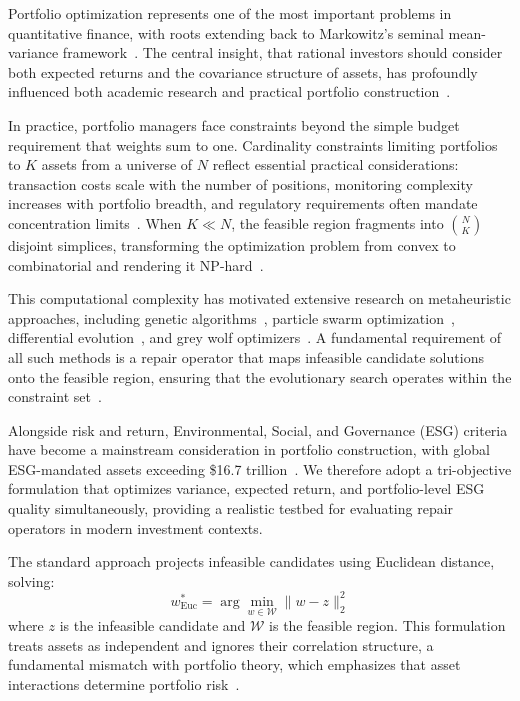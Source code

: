\documentclass[10pt,twocolumn,a4paper]{article}
\begin{document}
Portfolio optimization represents one of the most important problems in quantitative finance, with roots extending back to Markowitz's seminal mean-variance framework~\cite{markowitz1952portfolio}. The central insight, that rational investors should consider both expected returns and the covariance structure of assets, has profoundly influenced both academic research and practical portfolio construction~\cite{zhang2018portfolio, kalayci2019comprehensive}.

In practice, portfolio managers face constraints beyond the simple budget requirement that weights sum to one. Cardinality constraints limiting portfolios to $K$ assets from a universe of $N$ reflect essential practical considerations: transaction costs scale with the number of positions, monitoring complexity increases with portfolio breadth, and regulatory requirements often mandate concentration limits~\cite{chang2000heuristics, cesarone2016small}. When $K \ll N$, the feasible region fragments into $\binom{N}{K}$ disjoint simplices, transforming the optimization problem from convex to combinatorial and rendering it NP-hard~\cite{chang2000heuristics}.

This computational complexity has motivated extensive research on metaheuristic approaches, including genetic algorithms~\cite{chang2000heuristics}, particle swarm optimization~\cite{liagkouras2018hybrid}, differential evolution~\cite{kalayci2019comprehensive}, and grey wolf optimizers~\cite{mirjalili2014grey, mirjalili2016multi}. A fundamental requirement of all such methods is a repair operator that maps infeasible candidate solutions onto the feasible region, ensuring that the evolutionary search operates within the constraint set~\cite{liagkouras2019multi}.

Alongside risk and return, Environmental, Social, and Governance (ESG) criteria have become a mainstream consideration in portfolio construction, with global ESG-mandated assets exceeding \$16.7 trillion~\cite{gsia2022report}. We therefore adopt a tri-objective formulation that optimizes variance, expected return, and portfolio-level ESG quality simultaneously, providing a realistic testbed for evaluating repair operators in modern investment contexts.

The standard approach projects infeasible candidates using Euclidean distance, solving:
\begin{equation}
w^*_{\text{Euc}} = \arg\min_{w \in \mathcal{W}} \|w - z\|_2^2
\label{eq:euclidean}
\end{equation}
where $z$ is the infeasible candidate and $\mathcal{W}$ is the feasible region. This formulation treats assets as independent and ignores their correlation structure, a fundamental mismatch with portfolio theory, which emphasizes that asset interactions determine portfolio risk~\cite{rutkowska2013fundamental}.
\end{document}
